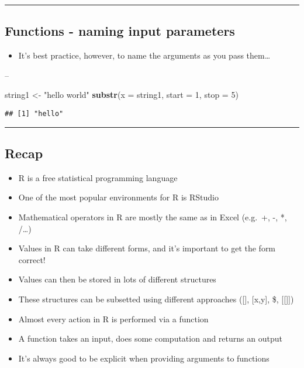 \documentclass[]{article}
\newenvironment{Shaded}{\begin{snugshade}}{\end{snugshade}}
\newcommand{\DataTypeTok}[1]{\textcolor[rgb]{0.13,0.29,0.53}{#1}}
\newcommand{\DecValTok}[1]{\textcolor[rgb]{0.00,0.00,0.81}{#1}}
\newcommand{\KeywordTok}[1]{\textcolor[rgb]{0.13,0.29,0.53}{\textbf{#1}}}
\newcommand{\NormalTok}[1]{#1}
\newcommand{\StringTok}[1]{\textcolor[rgb]{0.31,0.60,0.02}{#1}}
\providecommand{\tightlist}{%
  \setlength{\itemsep}{0pt}\setlength{\parskip}{0pt}}
\begin{document}
\begin{center}\rule{0.5\linewidth}{\linethickness}\end{center}

\hypertarget{functions---naming-input-parameters-2}{%
\subsection{Functions - naming input
parameters}\label{functions---naming-input-parameters-2}}

\begin{itemize}
\tightlist
\item
  It's best practice, however, to name the arguments as you pass
  them\ldots{}
\end{itemize}

--

\begin{Shaded}
\begin{Highlighting}[]
\NormalTok{string1 <-}\StringTok{ "hello world"}
\KeywordTok{substr}\NormalTok{(}\DataTypeTok{x =}\NormalTok{ string1, }\DataTypeTok{start =} \DecValTok{1}\NormalTok{, }\DataTypeTok{stop =} \DecValTok{5}\NormalTok{)}
\end{Highlighting}
\end{Shaded}

\begin{verbatim}
## [1] "hello"
\end{verbatim}

\begin{center}\rule{0.5\linewidth}{\linethickness}\end{center}

\hypertarget{recap}{%
\subsection{Recap}\label{recap}}

\begin{itemize}
\tightlist
\item
  R is a free statistical programming language
\item
  One of the most popular environments for R is RStudio
\item
  Mathematical operators in R are mostly the same as in Excel (e.g.~+,
  -, *, /\ldots)
\item
  Values in R can take different forms, and it's important to get the
  form correct!
\item
  Values can then be stored in lots of different structures
\item
  These structures can be subsetted using different approaches ({[}{]},
  {[}x,y{]}, \$, {[}{[}{]}{]})
\item
  Almost every action in R is performed via a function
\item
  A function takes an input, does some computation and returns an output
\item
  It's always good to be explicit when providing arguments to functions
\end{itemize}
\end{document}
